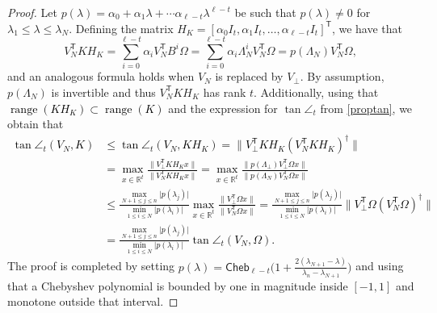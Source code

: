 \documentclass{siamart190516}
\newcommand{\range}{\mathop\mathrm{range}}
\newcommand{\Ttran}{\mathsf{T}}
\newcommand{\R}{\mathbb{R}}
\newcommand{\cheb}{\mathsf{Cheb}}
\providecommand{\abs}[1]{\lvert#1\rvert}
\providecommand{\norm}[1]{\lVert#1\rVert}
\newcommand{\edit}[1]{\textcolor{black}{#1}} %
\newcommand{\redit}[1]{\textcolor{black}{#1}} %
\begin{document}
\begin{proof}
Let $p(\lambda) = \alpha_0 + \alpha_1 \lambda + \dotsb \alpha_{\ell -t} \lambda^{\ell - t}$ be such that $p(\lambda) \not=0$ for 
$\lambda_{1}\leq \lambda\leq \lambda_{N}$. Defining the matrix $H_{K} = [\alpha_{0}I_{t},\alpha_{1}I_{t},\dotsc,\alpha_{\ell-t}I_{t}]^{\Ttran}$, we have that 
    \begin{equation*}
        V_{N}^{\Ttran}KH_{K} = \sum_{i=0}^{\ell-t}\alpha_{i}V_{N}^{\Ttran}B^{i}\Omega = \sum_{i=0}^{\ell-t}\alpha_{i}\Lambda_{N}^{i}V_{N}^{\Ttran}\Omega=p(\Lambda_{N})V_{N}^{\Ttran}\Omega,
    \end{equation*}
    and an analogous formula holds when $V_{N}$ is replaced by $V_\perp$.
    By assumption, $p(\Lambda_{N})$ is invertible and thus $V_{N}^{\Ttran}KH_{K}$ has rank $t$. Additionally, using that
    \edit{$\range(KH_{K})\subset \range (K)$}
    and 
    the expression for $\tan\angle_{t}$ from \cref{proptan}, we obtain that
    \redit{
    \begin{equation*}
        \begin{aligned}
            \tan\angle_{t}(V_{N},K)&\leq \tan\angle_{t}(V_{N},KH_{K})= \norm{V_{\perp}^{\Ttran}KH_{K}(V_{N}^{\Ttran}KH_{K})^{\dagger}} \\ 
            &=\max_{x\in\R^{t}}\frac{\norm{V_{\perp}^{\Ttran}KH_{K}x}}{\norm{V_{N}^{\Ttran}KH_{K}x}}
            =\max_{x\in\R^{t}}
            \frac{\norm{p(\Lambda_{\perp})V_{\perp}^{\Ttran}\Omega x}}{\norm{p(\Lambda_{N})V_{N}^{\Ttran}\Omega x}}\\
            &\leq \frac{\max\limits_{N+1\leq j\leq n}\abs{p(\lambda_{j})}}{\min\limits_{1\leq i\leq N}\abs{p(\lambda_{i})}}
            \max_{x\in\R^{t}}\frac{\norm{V_{\perp}^{\Ttran}\Omega x}}{\norm{V_{N}^{\Ttran}\Omega x}} 
            = \frac{\max\limits_{N+1\leq j\leq n}\abs{p(\lambda_{j})}}{\min\limits_{1\leq i\leq N}\abs{p(\lambda_{i})}}\norm{V_{\perp}^{\Ttran}\Omega(V_{N}^{\Ttran}\Omega)^{\dagger}}\\ 
            &=\frac{\max\limits_{N+1\leq j\leq n}\abs{p(\lambda_{j})}}{\min\limits_{1\leq i\leq N}\abs{p(\lambda_{i})}}\tan\angle_{t}(V_{N},\Omega).
        \end{aligned}
    \end{equation*}}
    The proof is completed by setting
    $p(\lambda) = \cheb_{\ell-t}\bigl(1+\frac{2(\lambda_{N+1}-\lambda)}{\lambda_{n}-\lambda_{N+1}}\bigr)$ and using that a Chebyshev polynomial is bounded by one in magnitude inside $[-1,1]$ and monotone outside that interval.
\end{proof}
\end{document}
